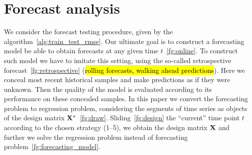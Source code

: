 \documentclass[12pt]{article}
\begin{document}
\section{Forecast analysis}
We consider the forecast testing procedure, given by the algorithm~\ref{alg:train_test_rmse}.
Our ultimate goal is to construct a forecasting model be able to obtain forecasts at any given time $t$~\ref{fg:online}. To construct such model we have to imitate this setting, using the so-called retrospective forecast~\ref{fg:retrospective} (\hl{rolling forecasts, walking ahead predictions}). Here we conceal most recent historical samples and make predictions as if they were unknown. Then the quality of the model is evaluated according to its performance on these concealed samples. In this paper we convert the forecasting problem to regression problem,  considering the segments of time series as objects of the design matrix ${\mathbf{X}}^{*}$~\ref{fg:draw}. Sliding~\ref{fg:design} the ``current'' time point $t$ according to the chosen strategy (1--5), we obtain the design matrix ${\mathbf{X}}$ and further we solve the regression problem instead of forecasting problem~\ref{fg:forecasting_model}.
\end{document}
